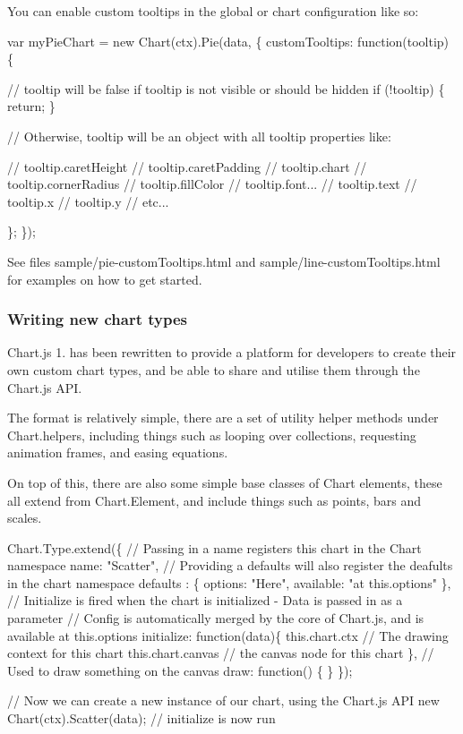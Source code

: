 You can enable custom tooltips in the global or chart configuration like so\+:


\begin{DoxyCode}
var myPieChart = new Chart(ctx).Pie(data, \{
    customTooltips: function(tooltip) \{

        // tooltip will be false if tooltip is not visible or should be hidden
        if (!tooltip) \{
            return;
        \}

        // Otherwise, tooltip will be an object with all tooltip properties like:

        // tooltip.caretHeight
        // tooltip.caretPadding
        // tooltip.chart
        // tooltip.cornerRadius
        // tooltip.fillColor
        // tooltip.font...
        // tooltip.text
        // tooltip.x
        // tooltip.y
        // etc...

    \};
\});
\end{DoxyCode}


See files {\ttfamily sample/pie-\/custom\+Tooltips.\+html} and {\ttfamily sample/line-\/custom\+Tooltips.\+html} for examples on how to get started.

\subsubsection*{Writing new chart types}

Chart.\+js 1. has been rewritten to provide a platform for developers to create their own custom chart types, and be able to share and utilise them through the Chart.\+js A\+PI.

The format is relatively simple, there are a set of utility helper methods under {\ttfamily Chart.\+helpers}, including things such as looping over collections, requesting animation frames, and easing equations.

On top of this, there are also some simple base classes of Chart elements, these all extend from {\ttfamily Chart.\+Element}, and include things such as points, bars and scales.


\begin{DoxyCode}
Chart.Type.extend(\{
    // Passing in a name registers this chart in the Chart namespace
    name: "Scatter",
    // Providing a defaults will also register the deafults in the chart namespace
    defaults : \{
        options: "Here",
        available: "at this.options"
    \},
    // Initialize is fired when the chart is initialized - Data is passed in as a parameter
    // Config is automatically merged by the core of Chart.js, and is available at this.options
    initialize:  function(data)\{
        this.chart.ctx // The drawing context for this chart
        this.chart.canvas // the canvas node for this chart
    \},
    // Used to draw something on the canvas
    draw: function() \{
    \}
\});

// Now we can create a new instance of our chart, using the Chart.js API
new Chart(ctx).Scatter(data);
// initialize is now run
\end{DoxyCode}


